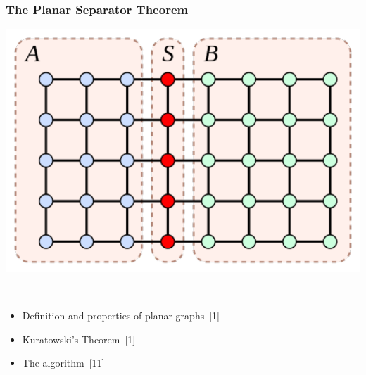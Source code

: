 \documentclass[titlepage,german,presentation]{beamer}
\begin{document}
\begin{frame}
\frametitle{The Planar Separator Theorem}
\begin{center}
\includegraphics[height=0.3\textwidth]{separator.pdf}\qquad \qquad
\end{center}
~\\
\begin{itemize}
\item Definition and properties of planar graphs~[1]
\medskip
\item Kuratowski's Theorem~[1]
\medskip
\item The algorithm~[11]
\end{itemize}

\end{frame}
\end{document}
